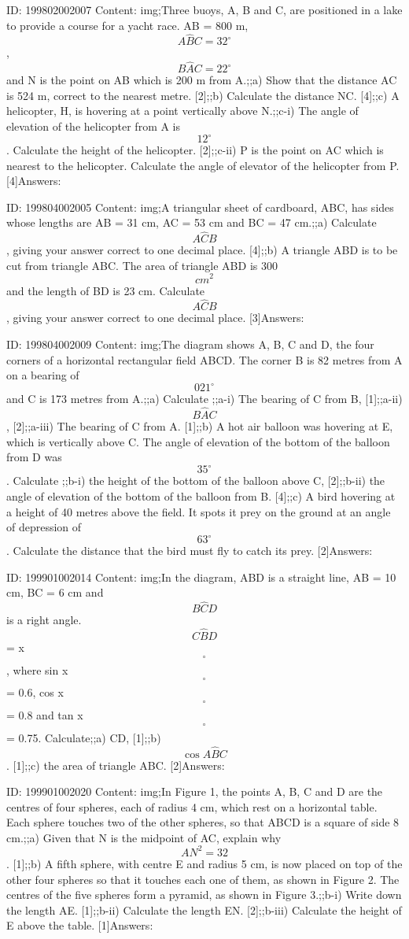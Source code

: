 \documentclass{article}
\begin{document}
ID: 199802002007
Content:
img;Three buoys, A, B and C, are positioned in a lake to provide a course for a yacht race. AB = 800 m, $$A \hat BC=32^{\circ}$$, $$B \hat AC=22^{\circ}$$ and N is the point on AB which is 200 m from A.;;a) Show that the distance AC is 524 m, correct to the nearest metre. [2];;b) Calculate the distance NC. [4];;c) A helicopter, H, is hovering at a point vertically above N.;;c-i) The angle of elevation of the helicopter from A is $$12^{\circ}$$. Calculate the height of the helicopter. [2];;c-ii) P is the point on AC which is nearest to the helicopter. Calculate the angle of elevator of the helicopter from P. [4]Answers:

ID: 199804002005
Content:
img;A triangular sheet of cardboard, ABC, has sides whose lengths are AB = 31 cm, AC = 53 cm and BC = 47 cm.;;a) Calculate $$A \hat CB$$, giving your answer correct to one decimal place. [4];;b) A triangle ABD is to be cut from triangle ABC. The area of triangle ABD is 300$$cm^2$$ and the length of BD is 23 cm. Calculate $$A \hat CB$$, giving your answer correct to one decimal place. [3]Answers:

ID: 199804002009
Content:
img;The diagram shows A, B, C and D, the four corners of a horizontal rectangular field ABCD. The corner B is 82 metres from A on a bearing of $$021^{\circ}$$ and C is 173 metres from A.;;a) Calculate ;;a-i) The bearing of C from B, [1];;a-ii) $$B \hat AC$$, [2];;a-iii) The bearing of C from A. [1];;b) A hot air balloon was hovering at E, which is vertically above C. The angle of elevation of the bottom of the balloon from D was $$35^{\circ}$$. Calculate ;;b-i) the height of the bottom of the balloon above C, [2];;b-ii) the angle of elevation of the bottom of the balloon from B. [4];;c) A bird hovering at a height of 40 metres above the field. It spots it prey on the ground at an angle of depression of $$63^{\circ}$$. Calculate the distance that the bird must fly to catch its prey. [2]Answers:

ID: 199901002014
Content:
img;In the diagram, ABD is a straight line, AB = 10 cm, BC = 6 cm and $$B \hat CD$$ is a right angle. $$C \hat BD$$ = x$$^{\circ}$$, where sin x$$^{\circ}$$ = 0.6, cos x$$^{\circ}$$ = 0.8 and tan x$$^{\circ}$$ = 0.75. Calculate;;a) CD, [1];;b) $$\cos A \hat BC$$. [1];;c) the area of triangle ABC. [2]Answers:

ID: 199901002020
Content:
img;In Figure 1, the points A, B, C and D are the centres of four spheres, each of radius 4 cm, which rest on a horizontal table. Each sphere touches two of the other spheres, so that ABCD is a square of side 8 cm.;;a) Given that N is the midpoint of AC, explain why $$AN^{2} =32$$. [1];;b) A fifth sphere, with centre E and radius 5 cm, is now placed on top of the other four spheres so that it touches each one of them, as shown in Figure 2. The centres of the five spheres form a pyramid, as shown in Figure 3.;;b-i) Write down the length AE. [1];;b-ii) Calculate the length EN. [2];;b-iii) Calculate the height of E above the table. [1]Answers:
\end{document}
